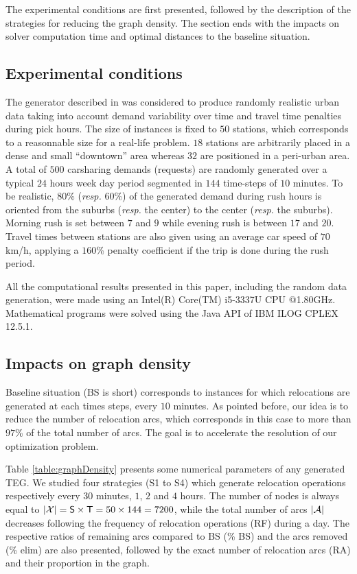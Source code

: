 \begin{bibunit}[ieeetr]
The experimental conditions are first presented, followed by the description of the strategies for reducing the graph density.
The section ends with the impacts on solver computation time and optimal distances to the baseline situation. 

\subsection{Experimental conditions}
The generator described in \cite{carlier2014} was considered to produce randomly realistic urban data taking into account demand variability over time and travel time penalties during pick hours.
The size of instances is fixed to $50$ stations, which corresponds to a reasonnable size for a real-life problem.
$18$ stations are arbitrarily placed in a dense and small ``downtown'' area whereas $32$ are positioned in a peri-urban area. 
A total of $500$ carsharing demands (requests) are randomly generated over a typical $24$ hours week day period segmented in $144$ time-steps of $10$ minutes. 
To be realistic, $80$\% ({\em resp.} $60$\%) of the generated demand during rush hours is oriented from the suburbs ({\em resp.} the center) to the center ({\em resp.} the suburbs). 
Morning rush is set between $7$ and $9$ while evening rush is between $17$ and $20$. 
Travel times between stations are also  given using an average car speed of $70$km/h, applying a $160$\% penalty coefficient if the trip is done during the rush period.

All the computational results presented in this paper, including the random data generation, were made using an Intel(R) Core(TM) i5-3337U CPU @1.80GHz. Mathematical programs were solved using the Java API of IBM ILOG CPLEX 12.5.1.

\subsection{Impacts on graph density}
Baseline situation (BS is short) corresponds to instances for which relocations are generated at each times steps, \ie every $10$ minutes.
As pointed before, our idea is to reduce the number of relocation arcs, which corresponds in this case to more than $97$\% of the total number of arcs.
The goal is to accelerate the resolution of our optimization problem.

Table \ref{table:graphDensity} presents some numerical parameters of any generated TEG.
We studied four strategies (S1 to S4) which generate relocation operations respectively every $30$ minutes, $1$, $2$ and $4$ hours. 
The number of nodes is always equal to $|\mathcal{X}| = \mathsf{S} \times \mathsf{T} = 50 \times 144 = 7200$, while the total number of arcs $|\mathcal{A}|$ decreases following the frequency of relocation operations (RF) during a day.
The respective ratios of remaining arcs compared to BS (\% BS) and the arcs removed (\% elim) are also presented, followed by the exact number of relocation arcs (RA) and their proportion in the graph.


\end{bibunit}
